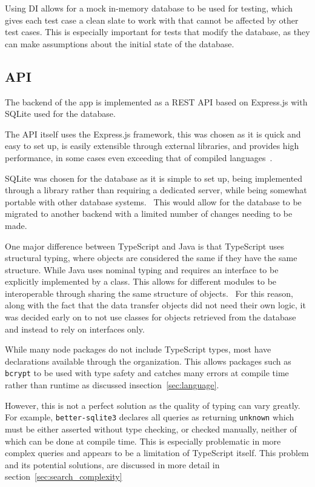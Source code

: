 Using DI allows for a mock in-memory database to be used for testing, which gives each test case a clean slate to work with
that cannot be affected by other test cases. This is especially important for tests that modify the database, as they can
make assumptions about the initial state of the database.

\subsection{API}

The backend of the app is implemented as a REST API based on Express.js with SQLite
used for the database.

The API itself uses the Express.js framework, this was chosen as it is quick and easy to set up, is easily extensible
through external libraries, and provides high performance, in some cases even exceeding that of
compiled languages~\cite{karlsson_performance_2021}.

SQLite was chosen for the database as it is simple to set up, being implemented through
a library rather than requiring a dedicated server, while being somewhat portable with other
database systems.~\cite{kreibich_using_2010} This would allow for the database to be migrated to
another backend with a limited number of changes needing to be made.

One major difference between TypeScript and Java is that TypeScript uses structural typing, where objects are considered
the same if they have the same structure. While Java uses nominal typing and requires an interface to be explicitly
implemented by a class. This allows for different modules to be interoperable through sharing the same structure of objects.~\cite{gil_whiteoak_2008}
For this reason, along with the fact that the data transfer objects did not need their own logic, it was decided early on
to not use classes for objects retrieved from the database and instead to rely on interfaces only.

While many node packages do not include TypeScript types, most have declarations available through the  organization.
This allows packages such as \texttt{bcrypt} to be used with type safety and catches many errors at compile time rather than runtime as discussed
insection~\ref{sec:language}.

However, this is not a perfect solution as the quality of typing can vary greatly. For example, \texttt{better-sqlite3}
declares all queries as returning \texttt{unknown} which must be either asserted without type checking, or checked manually, neither of which
can be done at compile time. This is especially problematic in more complex queries and appears to be a limitation of TypeScript itself. This
problem and its potential solutions, are discussed in more detail in section~\ref{sec:search_complexity}

